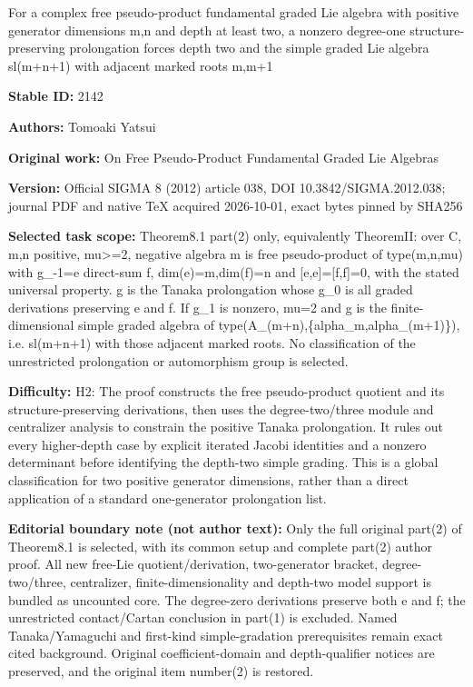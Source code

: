 \documentclass[11pt]{article}
\numberwithin{equation}{section}
\numberwithin{theorem}{section}
\numberwithin{proposition}{section}
\numberwithin{lemma}{section}
\numberwithin{corollary}{section}
\numberwithin{definition}{section}
\numberwithin{example}{section}
\numberwithin{remark}{section}
\numberwithin{note}{section}
\begin{document}
\begin{center}\Large For a complex free pseudo-product fundamental graded Lie algebra with positive generator dimensions m,n and depth at least two, a nonzero degree-one structure-preserving prolongation forces depth two and the simple graded Lie algebra sl(m+\allowbreak{}n+\allowbreak{}1) with adjacent marked roots m,m+\allowbreak{}1\end{center}
\noindent\textbf{Stable ID:} 2142\par
\noindent\textbf{Authors:} Tomoaki Yatsui\par
\noindent\textbf{Original work:} On Free Pseudo-Product Fundamental Graded Lie Algebras\par
\noindent\textbf{Version:} Official SIGMA 8 (2012) article 038, DOI 10.3842/SIGMA.2012.038; journal PDF and native TeX acquired 2026-10-01, exact bytes pinned by SHA256\par
\noindent\textbf{Selected task scope:} Theorem8.1 part(2) only, equivalently TheoremII: over C, m,n positive, mu>=\allowbreak{}2, negative algebra m is free pseudo-product of type(m,n,mu) with g\_-1=\allowbreak{}e direct-sum f, dim(e)=\allowbreak{}m,dim(f)=\allowbreak{}n and [e,e]=\allowbreak{}[f,f]=\allowbreak{}0, with the stated universal property. g is the Tanaka prolongation whose g\_0 is all graded derivations preserving e and f. If g\_1 is nonzero, mu=\allowbreak{}2 and g is the finite-dimensional simple graded algebra of type(A\_(m+\allowbreak{}n),\{alpha\_m,alpha\_(m+\allowbreak{}1)\}), i.e. sl(m+\allowbreak{}n+\allowbreak{}1) with those adjacent marked roots. No classification of the unrestricted prolongation or automorphism group is selected.\par
\noindent\textbf{Difficulty:} H2: The proof constructs the free pseudo-product quotient and its structure-preserving derivations, then uses the degree-two/three module and centralizer analysis to constrain the positive Tanaka prolongation. It rules out every higher-depth case by explicit iterated Jacobi identities and a nonzero determinant before identifying the depth-two simple grading. This is a global classification for two positive generator dimensions, rather than a direct application of a standard one-generator prolongation list.\par
\noindent\textbf{Editorial boundary note (not author text):} Only the full original part(2) of Theorem8.1 is selected, with its common setup and complete part(2) author proof. All new free-Lie quotient/derivation, two-generator bracket, degree-two/three, centralizer, finite-dimensionality and depth-two model support is bundled as uncounted core. The degree-zero derivations preserve both e and f; the unrestricted contact/Cartan conclusion in part(1) is excluded. Named Tanaka/Yamaguchi and first-kind simple-gradation prerequisites remain exact cited background. Original coefficient-domain and depth-qualifier notices are preserved, and the original item number(2) is restored.\par
\end{document}
